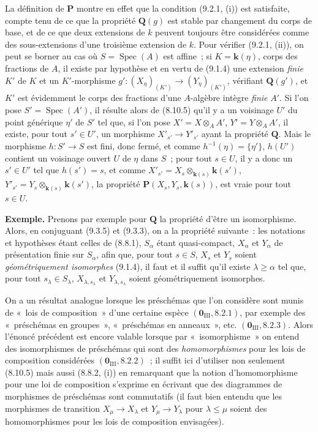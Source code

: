 La définition de $\boldsymbol{P}$ montre en effet que la condition (9.2.1, (i))
est satisfaite, compte tenu de ce que la propriété $\boldsymbol{Q}(g)$ est stable
par changement du corps de base, et de ce que deux extensions de $k$ peuvent
toujours être considérées comme des sous-extensions d'une troisième extension
de $k$. Pour vérifier (9.2.1, (ii)), on peut se borner au cas où
$S=\operatorname{Spec}(A)$ est affine~; si $K=\boldsymbol{k}(\eta)$, corps des fractions de
$A$, il existe par hypothèse et en vertu de (9.1.4) une extension \emph{finie} $K'$ de
$K$ et un $K'$-morphisme
$g':(X_\eta)_{(K')}\to(Y_\eta)_{(K')}$, vérifiant $\boldsymbol{Q}(g')$, et $K'$ est
évidemment le corps des fractions d'une $A$-algèbre intègre \emph{finie} $A'$. Si
l'on pose $S'=\operatorname{Spec}(A')$, il résulte alors de (8.10.5) qu'il y
a un voisinage $U'$ du point générique $\eta'$ de $S'$ tel que, si l'on pose
$X'=X\otimes_A A'$, $Y'=Y\otimes_A A'$, il existe, pour tout $s'\in U'$, un
morphisme $X'_{s'}\to Y'_{s'}$ ayant la propriété $\boldsymbol{Q}$. Mais le
morphisme $h:S'\to S$ est fini, donc fermé, et comme
$h^{-1}(\eta)=\{\eta'\}$, $h(U')$ contient un voisinage ouvert $U$ de $\eta$
dans $S$~; pour tout $s\in U$, il y a donc un $s'\in U'$ tel que $h(s')=s$,
et comme
$X'_{s'}=X_s\otimes_{\mathbf{k}(s)}\boldsymbol{k}(s')$,
$Y'_{s'}=Y_s\otimes_{\mathbf{k}(s)}\boldsymbol{k}(s')$, la propriété
$\boldsymbol{P}(X_s,Y_s,\boldsymbol{k}(s))$, est vraie pour tout $s\in U$.

\begin{env}[9.3.6]
\label{IV.9.3.6-fr}
\textbf{Exemple.} Prenons par exemple pour $\boldsymbol{Q}$ la propriété d'être un
isomorphisme. Alors, en conjuguant (9.3.5) et (9.3.3), on a la propriété
suivante~: les notations et hypothèses étant celles de (8.8.1), $S_\alpha$
étant quasi-compact, $X_\alpha$ et $Y_\alpha$ de présentation finie sur
$S_\alpha$, afin que, pour tout $s\in S$, $X_s$ et $Y_s$ soient
\emph{géométriquement isomorphes} (9.1.4), il faut et il suffit qu'il existe
$\lambda\geqslant\alpha$ tel que, pour tout $s_\lambda\in S_\lambda$,
$X_{\lambda,s_\lambda}$ et $Y_{\lambda,s_\lambda}$ soient géométriquement
isomorphes.
\end{env}

On a un résultat analogue lorsque les préschémas que l'on considère sont munis
de «~lois de composition~» d'une certaine espèce
$(\mathbf 0_{\mathrm{III}},8.2.1)$, par exemple des «~préschémas en groupes~»,
«~préschémas en anneaux~», etc. $(\mathbf 0_{\mathrm{III}},8.2.3)$. Alors
l'énoncé précédent est encore valable lorsque par «~isomorphisme~» on entend
des isomorphismes de préschémas qui sont des \emph{homomorphismes} pour les lois de
composition considérées $(\mathbf 0_{\mathrm{III}},8.2.2)$~; il suffit ici
d'utiliser non seulement (8.10.5) mais aussi (8.8.2, (i)) en remarquant que la
notion d'homomorphisme pour une loi de composition s'exprime en écrivant que
des diagrammes de morphismes de préschémas sont commutatifs (il faut bien
entendu que les morphismes de transition $X_\mu\to X_\lambda$ et
$Y_\mu\to Y_\lambda$ pour $\lambda\leqslant\mu$ soient des homomorphismes
pour les lois de composition envisagées).

